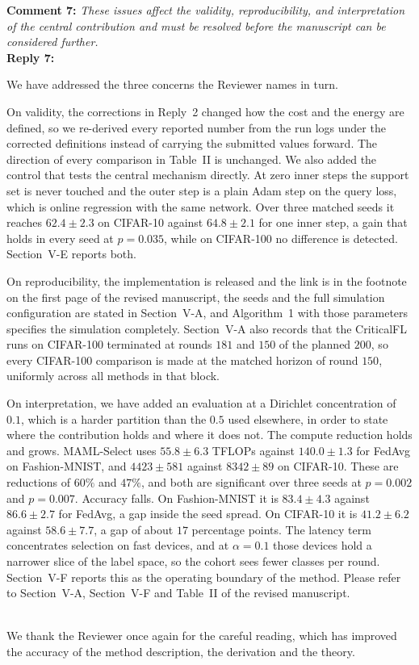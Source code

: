 \documentclass[10pt]{article}
\begin{document}
\noindent
\textbf{Comment 7:} \textit{These issues affect the validity, reproducibility, and interpretation of the central contribution and must be resolved before the manuscript can be considered further.}\\
\noindent
\textbf{Reply 7:} {We have addressed the three concerns the Reviewer names in turn.

On validity, the corrections in Reply~2 changed how the cost and the energy are defined, so we re-derived every reported number from the run logs under the corrected definitions instead of carrying the submitted values forward. The direction of every comparison in Table~II is unchanged. We also added the control that tests the central mechanism directly. At zero inner steps the support set is never touched and the outer step is a plain Adam step on the query loss, which is online regression with the same network. Over three matched seeds it reaches $62.4\pm2.3$ on CIFAR-10 against $64.8\pm2.1$ for one inner step, a gain that holds in every seed at $p=0.035$, while on CIFAR-100 no difference is detected. Section~V-E reports both.

On reproducibility, the implementation is released and the link is in the footnote on the first page of the revised manuscript, the seeds and the full simulation configuration are stated in Section~V-A, and Algorithm~1 with those parameters specifies the simulation completely. Section~V-A also records that the CriticalFL runs on CIFAR-100 terminated at rounds $181$ and $150$ of the planned $200$, so every CIFAR-100 comparison is made at the matched horizon of round $150$, uniformly across all methods in that block.

On interpretation, we have added an evaluation at a Dirichlet concentration of $0.1$, which is a harder partition than the $0.5$ used elsewhere, in order to state where the contribution holds and where it does not. The compute reduction holds and grows. MAML-Select uses $55.8\pm6.3$ TFLOPs against $140.0\pm1.3$ for FedAvg on Fashion-MNIST, and $4423\pm581$ against $8342\pm89$ on CIFAR-10. These are reductions of $60\%$ and $47\%$, and both are significant over three seeds at $p=0.002$ and $p=0.007$. Accuracy falls. On Fashion-MNIST it is $83.4\pm4.3$ against $86.6\pm2.7$ for FedAvg, a gap inside the seed spread. On CIFAR-10 it is $41.2\pm6.2$ against $58.6\pm7.7$, a gap of about $17$ percentage points. The latency term concentrates selection on fast devices, and at $\alpha=0.1$ those devices hold a narrower slice of the label space, so the cohort sees fewer classes per round. Section~V-F reports this as the operating boundary of the method. Please refer to Section~V-A, Section~V-F and Table~II of the revised manuscript.}\\

\vspace{0.5em}
We thank the Reviewer once again for the careful reading, which has improved the accuracy of the method description, the derivation and the theory.
\end{document}
